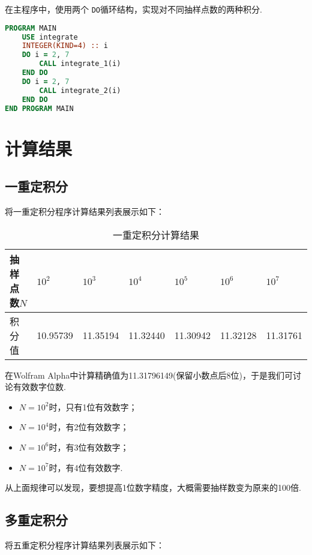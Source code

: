 \documentclass[12pt,a4paper,utf8]{ctexart}
\begin{document}
在主程序中，使用两个 \texttt{DO}循环结构，实现对不同抽样点数的两种积分.

\begin{framed}
\begin{lstlisting}[language=Fortran]
PROGRAM MAIN
    USE integrate
    INTEGER(KIND=4) :: i
    DO i = 2, 7
        CALL integrate_1(i)
    END DO
    DO i = 2, 7
        CALL integrate_2(i)
    END DO
END PROGRAM MAIN
\end{lstlisting}
\end{framed}

\section{计算结果}

\subsection{一重定积分}

将一重定积分程序计算结果列表展示如下：

\begin{table}[htb]
\centering
\begin{tabular}{|l|l|l|l|l|l|l|}
\hline
抽样点数$N$ & $10^2$   & $10^3$   & $10^4$   & $10^5$   & $10^6$   & $10^7$   \\ \hline
积分值  & 10.95739 & 11.35194 & 11.32440 & 11.30942 & 11.32128 & 11.31761 \\ \hline
\end{tabular}
\caption{一重定积分计算结果}
\end{table}

在Wolfram
Alpha中计算精确值为11.31796149(保留小数点后8位)，于是我们可讨论有效数字位数.
\begin{itemize}
    \item $N=10^2$时，只有1位有效数字；
    \item $N=10^4$时，有2位有效数字；
    \item $N=10^6$时，有3位有效数字；
    \item $N=10^7$时，有4位有效数字.
\end{itemize}

从上面规律可以发现，要想提高1位数字精度，大概需要抽样数变为原来的100倍.

\subsection{多重定积分}

将五重定积分程序计算结果列表展示如下：
\end{document}
